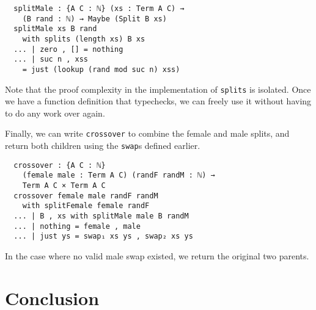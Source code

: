 \documentclass{acm_proc_article-sp}
\begin{document}
\begin{verbatim}
  splitMale : {A C : ℕ} (xs : Term A C) →
    (B rand : ℕ) → Maybe (Split B xs)
  splitMale xs B rand
    with splits (length xs) B xs
  ... | zero , [] = nothing
  ... | suc n , xss
    = just (lookup (rand mod suc n) xss)
\end{verbatim}

Note that the proof complexity in the implementation of
\texttt{splits} is isolated. Once we have a function definition that
typechecks, we can freely use it without having to do any work over
again.

Finally, we can write \texttt{crossover} to combine the female and
male splits, and return both children using the \texttt{swap}s defined
earlier.

\begin{verbatim}
  crossover : {A C : ℕ}
    (female male : Term A C) (randF randM : ℕ) →
    Term A C × Term A C
  crossover female male randF randM
    with splitFemale female randF
  ... | B , xs with splitMale male B randM
  ... | nothing = female , male
  ... | just ys = swap₁ xs ys , swap₂ xs ys
\end{verbatim}

In the case where no valid male swap existed, we return the original
two parents.

\section{Conclusion}



\end{document}
